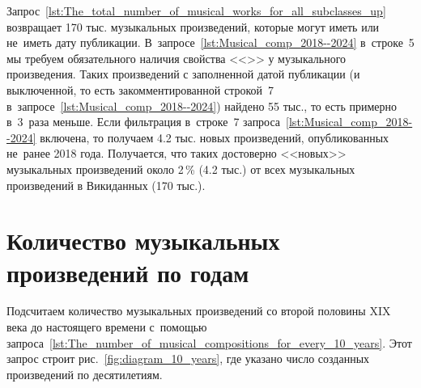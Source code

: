

Запрос~\ref{lst:The_total_number_of_musical_works_for_all_subclasses_up} 
возвращает 170 тыс. музыкальных произведений, которые могут иметь или не~иметь дату публикации. 
В~запросе~\ref{lst:Musical_comp_2018--2024} в~строке~5 
мы требуем обязательного наличия свойства <<>> у музыкального произведения.
Таких произведений с заполненной датой публикации 
(и выключенной, 
 то есть закомментированной строкой~7 в~запросе~\ref{lst:Musical_comp_2018--2024}) найдено 55 тыс., 
то есть примерно в~3~раза меньше. 
Если фильтрация в~строке~7 запроса~\ref{lst:Musical_comp_2018--2024} включена, 
то получаем 4.2 тыс. новых произведений, опубликованных не~ранее 2018 года. 
Получается, что таких достоверно <<новых>> музыкальных произведений 
около 2\,\% (4.2 тыс.) от всех музыкальных произведений в Викиданных (170 тыс.).



\newpage
\section{Количество музыкальных произведений по годам}

Подсчитаем количество музыкальных произведений 
со второй половины XIX века до настоящего времени 
с~помощью запроса~\ref{lst:The_number_of_musical_compositions_for_every_10_years}. 
Этот запрос строит рис.~\ref{fig:diagram_10_years}, где 
указано число созданных произведений по десятилетиям. 


